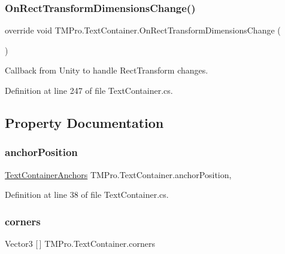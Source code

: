 \subsubsection{\texorpdfstring{OnRectTransformDimensionsChange()}{OnRectTransformDimensionsChange()}}
{\footnotesize\ttfamily override void T\+M\+Pro.\+Text\+Container.\+On\+Rect\+Transform\+Dimensions\+Change (\begin{DoxyParamCaption}{ }\end{DoxyParamCaption})\hspace{0.3cm}{\ttfamily [protected]}}



Callback from Unity to handle Rect\+Transform changes. 



Definition at line 247 of file Text\+Container.\+cs.



\subsection{Property Documentation}
\mbox{\label{class_t_m_pro_1_1_text_container_ac1d17c9ad6d688b3c98fc2ba7b8287c7}} 
\subsubsection{\texorpdfstring{anchorPosition}{anchorPosition}}
{\footnotesize\ttfamily \mbox{\hyperlink{namespace_t_m_pro_a19b6f6ab9f030ef024cf96f3c9e86d8f}{Text\+Container\+Anchors}} T\+M\+Pro.\+Text\+Container.\+anchor\+Position\hspace{0.3cm}{\ttfamily [get]}, {\ttfamily [set]}}



Definition at line 38 of file Text\+Container.\+cs.

\mbox{\label{class_t_m_pro_1_1_text_container_a87118ed8a2ea2d53256a4716de16dd73}} 
\subsubsection{\texorpdfstring{corners}{corners}}
{\footnotesize\ttfamily Vector3 \mbox{[}$\,$\mbox{]} T\+M\+Pro.\+Text\+Container.\+corners\hspace{0.3cm}{\ttfamily [get]}}




